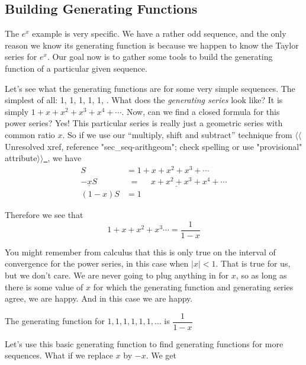 \documentclass[10pt,]{book}
\theoremstyle{plain}
\theoremstyle{definition}
\theoremstyle{definition}
\theoremstyle{definition}
\theoremstyle{definition}
\numberwithin{equation}{chapter}
\newcommand{\lt}{<}
\newcommand{\amp}{&}
\begin{document}
\subsection[{Building Generating Functions}]{Building Generating Functions}\label{subsection-21}
\hypertarget{p-960}{}%
The \(e^x\) example is very specific. We have a rather odd sequence, and the only reason we know its generating function is because we happen to know the Taylor series for \(e^x\). Our goal now is to gather some tools to build the generating function of a particular given sequence.%
\par
\hypertarget{p-961}{}%
Let's see what the generating functions are for some very simple sequences. The simplest of all: 1, 1, 1, 1, 1, \textellipsis{}. What does the \emph{generating series} look like? It is simply \(1 + x + x^2 + x^3 + x^4 + \cdots\). Now, can we find a closed formula for this power series? Yes! This particular series is really just a geometric series with common ratio \(x\). So if we use our ``multiply, shift and subtract'' technique from {$\langle\langle$Unresolved xref, reference "sec\_seq-arithgeom"; check spelling or use "provisional" attribute$\rangle\rangle$}\hyperlink{}{~}, we have%
\begin{align*}
S \amp  = 1 + x + x^2 + x^3 + \cdots\\
\underline{- xS} \amp  \underline{\,\, = ~~~~~~ x + x^2 + x^3 + x^4 + \cdots}\\
(1-x)S \amp  = 1
\end{align*}
%
\par
\hypertarget{p-962}{}%
Therefore we see that%
\begin{equation*}
1 + x + x^2 + x^3 \cdots = \dfrac{1}{1-x}
\end{equation*}
%
\par
\hypertarget{p-963}{}%
You might remember from calculus that this is only true on the interval of convergence for the power series, in this case when \(|x| \lt  1\). That is true for us, but we don't care. We are never going to plug anything in for \(x\), so as long as there is some value of \(x\) for which the generating function and generating series agree, we are happy. And in this case we are happy.%
\begin{assemblage}[\(1,1,1,\ldots\)]\label{assemblage-12}
\hypertarget{p-964}{}%
The generating function for \(1,1,1,1,1,1,\ldots\) is \(\dfrac{1}{1-x}\)%
\end{assemblage}
\hypertarget{p-965}{}%
Let's use this basic generating function to find generating functions for more sequences. What if we replace \(x\) by \(-x\). We get%
\end{document}
